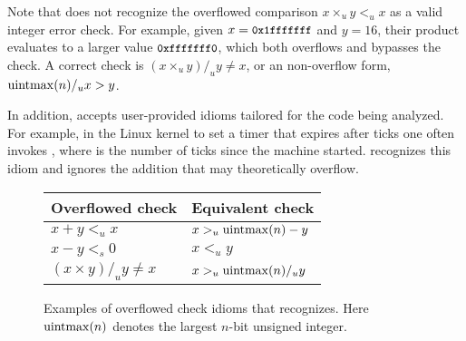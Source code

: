 Note that \sys does not recognize the overflowed comparison $x
\times_u y <_u x$ as a valid integer error check.  For example,
given $x = \cc{0x1fffffff}$ and $y = 16$, their product evaluates
to a larger value $\cc{0xfffffff0}$, which both overflows and
bypasses the check.  A correct check is $(x \times_u y) /_u y \neq
x$, or an non-overflow form, $\operatorname{uintmax}(n) /_u x > y$.

In addition, \sys accepts user-provided idioms tailored for the
code being analyzed.  For example, in the Linux kernel to set a
timer that expires after  ticks one often invokes
, where  is the
number of ticks since the machine started.  \sys recognizes
this idiom and ignores the addition  that may
theoretically overflow.

\begin{figure}
\centering
\begin{tabular}{ll}
\toprule
Overflowed check & Equivalent check \\ \midrule
$x + y <_u x$ & $x >_u \operatorname{uintmax}(n) - y$ \\
$x - y <_s 0$ & $x <_u y$ \\
$(x \times y) /_u y \neq x$ & $x >_u \operatorname{uintmax}(n) /_u y$   \\
\bottomrule
\end{tabular}
\caption{Examples of overflowed check idioms that \sys recognizes.
Here $\operatorname{uintmax}(n)$ denotes the largest $n$-bit unsigned integer.}
\label{f:whitelist}
\end{figure}
